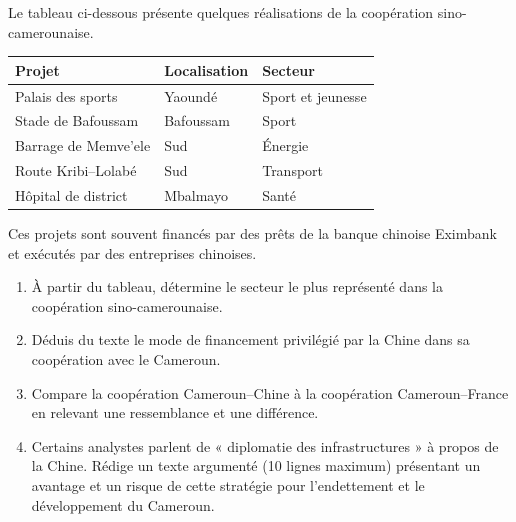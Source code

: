 \documentclass[11pt]{article}
\begin{document}
\begin{exercice}
Le tableau ci-dessous présente quelques réalisations de la coopération sino-camerounaise.

\begin{center}
\begin{tabular}{|l|l|l|}
\hline
\textbf{Projet} & \textbf{Localisation} & \textbf{Secteur} \\
\hline
Palais des sports & Yaoundé & Sport et jeunesse \\
\hline
Stade de Bafoussam & Bafoussam & Sport \\
\hline
Barrage de Memve'ele & Sud & Énergie \\
\hline
Route Kribi--Lolabé & Sud & Transport \\
\hline
Hôpital de district & Mbalmayo & Santé \\
\hline
\end{tabular}
\end{center}

Ces projets sont souvent financés par des prêts de la banque chinoise Eximbank et exécutés par des entreprises chinoises.
\begin{enumerate}
\item À partir du tableau, détermine le secteur le plus représenté dans la coopération sino-camerounaise.
\item Déduis du texte le mode de financement privilégié par la Chine dans sa coopération avec le Cameroun.
\item Compare la coopération Cameroun--Chine à la coopération Cameroun--France en relevant une ressemblance et une différence.
\item Certains analystes parlent de « diplomatie des infrastructures » à propos de la Chine. Rédige un texte argumenté (10 lignes maximum) présentant un avantage et un risque de cette stratégie pour l'endettement et le développement du Cameroun.
\end{enumerate}
\end{exercice}
\end{document}
